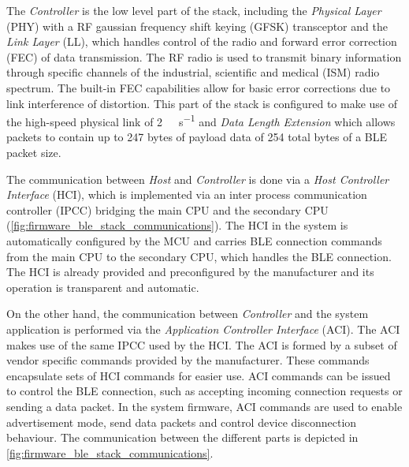 The \textit{Controller} is the low level part of the stack, including the \textit{Physical Layer} (PHY) with a RF gaussian frequency shift keying (GFSK) transceptor and the \textit{Link Layer} (LL), which handles control of the radio and forward error correction (FEC) of data transmission. The RF radio is used to transmit binary information through specific channels of the industrial, scientific and medical (ISM) radio spectrum. The built-in FEC capabilities allow for basic error corrections due to link interference of distortion. This part of the stack is configured to make use of the high-speed physical link of \SI{2}{\mega\bit\per\second} and \textit{Data Length Extension} which allows packets to contain up to 247 bytes of payload data of 254 total bytes of a BLE packet size.

The communication between \textit{Host} and \textit{Controller} is done via a \textit{Host Controller Interface} (HCI), which is implemented via an inter process communication controller (IPCC) bridging the main CPU and the secondary CPU (\cref{fig:firmware_ble_stack_communications}). The HCI in the system is automatically configured by the MCU and carries BLE connection commands from the main CPU to the secondary CPU, which handles the BLE connection. The HCI is already provided and preconfigured by the manufacturer and its operation is transparent and automatic.

On the other hand, the communication between \textit{Controller} and the system application is performed via the \textit{Application Controller Interface} (ACI). The ACI makes use of the same IPCC used by the HCI. The ACI is formed by a subset of vendor specific commands provided by the manufacturer. These commands encapsulate sets of HCI commands for easier use. ACI commands can be issued to control the BLE connection, such as accepting incoming connection requests or sending a data packet. In the system firmware, ACI commands are used to enable advertisement mode, send data packets and control device disconnection behaviour. The communication between the different parts is depicted in \cref{fig:firmware_ble_stack_communications}.

